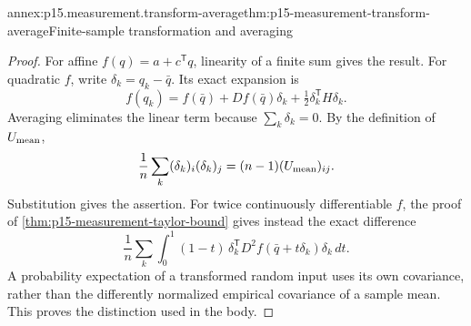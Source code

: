 \begin{annexitem}{annex:p15.measurement.transform-average}{thm:p15-measurement-transform-average}{Finite-sample transformation and averaging}
\begin{proof}
For affine \(f(q)=a+c^{\mathsf T}q\), linearity of a finite sum gives
the result. For quadratic \(f\), write \(\delta_k=q_k-\bar q\).
Its exact expansion is
\[
 f(q_k)=f(\bar q)+Df(\bar q)\delta_k+
                   \tfrac12\delta_k^{\mathsf T}H\delta_k.
\]
Averaging eliminates the linear term because \(\sum_k\delta_k=0\).
By the definition of \(U_{\rm mean}\),
\[
 \frac1n\sum_k(\delta_k)_i(\delta_k)_j
       =(n-1)(U_{\rm mean})_{ij}.
\]
Substitution gives the assertion.
For twice continuously differentiable \(f\), the proof of
\cref{thm:p15-measurement-taylor-bound} gives instead the exact difference
\[
 \frac1n\sum_k\int_0^1(1-t)\,
  \delta_k^{\mathsf T}D^2f(\bar q+t\delta_k)\delta_k\,dt.
\]
A probability expectation of a transformed random input uses its own
covariance, rather than the differently normalized empirical covariance
of a sample mean. This proves the distinction used in the body.
\end{proof}
\end{annexitem}
